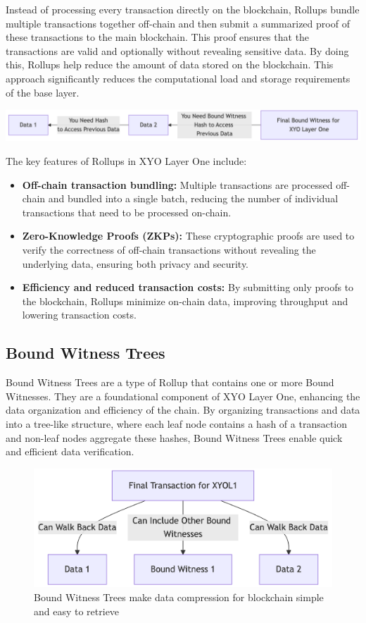 \documentclass{article}
\begin{document}
Instead of processing every transaction directly on the blockchain, Rollups bundle multiple transactions together off-chain and then submit a summarized proof of these transactions to the main blockchain. This proof ensures that the transactions are valid and optionally without revealing sensitive data. By doing this, Rollups help reduce the amount of data stored on the blockchain. This approach significantly reduces the computational load and storage requirements of the base layer. 

\begin{center}
    \includegraphics[width=15cm]{rollup.png}
\end{center}

The key features of Rollups in XYO Layer One include: 
\begin{itemize}
    \item \textbf{Off-chain transaction bundling:} Multiple transactions are processed off-chain and bundled into a single batch, reducing the number of individual transactions that need to be processed on-chain.
    \item \textbf{Zero-Knowledge Proofs (ZKPs):} These cryptographic proofs are used to verify the correctness of off-chain transactions without revealing the underlying data, ensuring both privacy and security. 
    \item \textbf{Efficiency and reduced transaction costs:} By submitting only proofs to the blockchain, Rollups minimize on-chain data, improving throughput and lowering transaction costs.
\end{itemize}

\subsection{Bound Witness Trees}
Bound Witness Trees are a type of Rollup that contains one or more Bound Witnesses. They are a foundational component of XYO Layer One, enhancing the data organization and efficiency of the chain. By organizing transactions and data into a tree-like structure, where each leaf node contains a hash of a transaction and non-leaf nodes aggregate these hashes, Bound Witness Trees enable quick and efficient data verification. 

\begin{figure}[ht]
    \centering
    \includegraphics[width=15cm]{bound-witness-trees.png}
    \caption{Bound Witness Trees make data compression for blockchain simple and easy to retrieve}
\end{figure}
\end{document}
